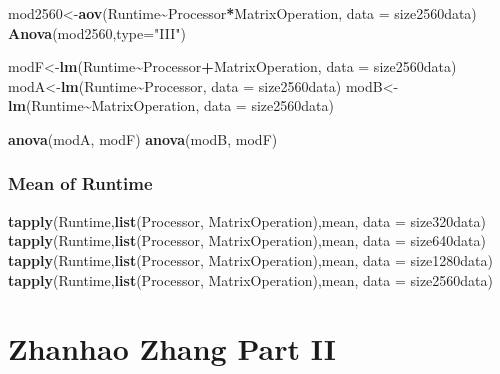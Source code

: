 \documentclass[
]{article}
\newenvironment{Shaded}{\begin{snugshade}}{\end{snugshade}}
\newcommand{\DataTypeTok}[1]{\textcolor[rgb]{0.13,0.29,0.53}{#1}}
\newcommand{\KeywordTok}[1]{\textcolor[rgb]{0.13,0.29,0.53}{\textbf{#1}}}
\newcommand{\NormalTok}[1]{#1}
\newcommand{\OperatorTok}[1]{\textcolor[rgb]{0.81,0.36,0.00}{\textbf{#1}}}
\newcommand{\StringTok}[1]{\textcolor[rgb]{0.31,0.60,0.02}{#1}}
\begin{document}
\begin{Shaded}
\begin{Highlighting}[]
\NormalTok{mod2560\textless{}{-}}\KeywordTok{aov}\NormalTok{(Runtime}\OperatorTok{\textasciitilde{}}\NormalTok{Processor}\OperatorTok{*}\NormalTok{MatrixOperation, }\DataTypeTok{data =}\NormalTok{ size2560data)}
\KeywordTok{Anova}\NormalTok{(mod2560,}\DataTypeTok{type=}\StringTok{"III"}\NormalTok{)}

\NormalTok{modF\textless{}{-}}\KeywordTok{lm}\NormalTok{(Runtime}\OperatorTok{\textasciitilde{}}\NormalTok{Processor}\OperatorTok{+}\NormalTok{MatrixOperation, }\DataTypeTok{data =}\NormalTok{ size2560data)}
\NormalTok{modA\textless{}{-}}\KeywordTok{lm}\NormalTok{(Runtime}\OperatorTok{\textasciitilde{}}\NormalTok{Processor, }\DataTypeTok{data =}\NormalTok{ size2560data)}
\NormalTok{modB\textless{}{-}}\KeywordTok{lm}\NormalTok{(Runtime}\OperatorTok{\textasciitilde{}}\NormalTok{MatrixOperation, }\DataTypeTok{data =}\NormalTok{ size2560data)}

\KeywordTok{anova}\NormalTok{(modA, modF)}
\KeywordTok{anova}\NormalTok{(modB, modF)}
\end{Highlighting}
\end{Shaded}

\hypertarget{mean-of-runtime}{%
\subsubsection{Mean of Runtime}\label{mean-of-runtime}}

\begin{Shaded}
\begin{Highlighting}[]
\KeywordTok{tapply}\NormalTok{(Runtime,}\KeywordTok{list}\NormalTok{(Processor, MatrixOperation),mean, }\DataTypeTok{data =}\NormalTok{ size320data)}
\KeywordTok{tapply}\NormalTok{(Runtime,}\KeywordTok{list}\NormalTok{(Processor, MatrixOperation),mean, }\DataTypeTok{data =}\NormalTok{ size640data)}
\KeywordTok{tapply}\NormalTok{(Runtime,}\KeywordTok{list}\NormalTok{(Processor, MatrixOperation),mean, }\DataTypeTok{data =}\NormalTok{ size1280data)}
\KeywordTok{tapply}\NormalTok{(Runtime,}\KeywordTok{list}\NormalTok{(Processor, MatrixOperation),mean, }\DataTypeTok{data =}\NormalTok{ size2560data)}
\end{Highlighting}
\end{Shaded}

\hypertarget{zhanhao-zhang-part-ii}{%
\section{Zhanhao Zhang Part II}\label{zhanhao-zhang-part-ii}}
\end{document}
